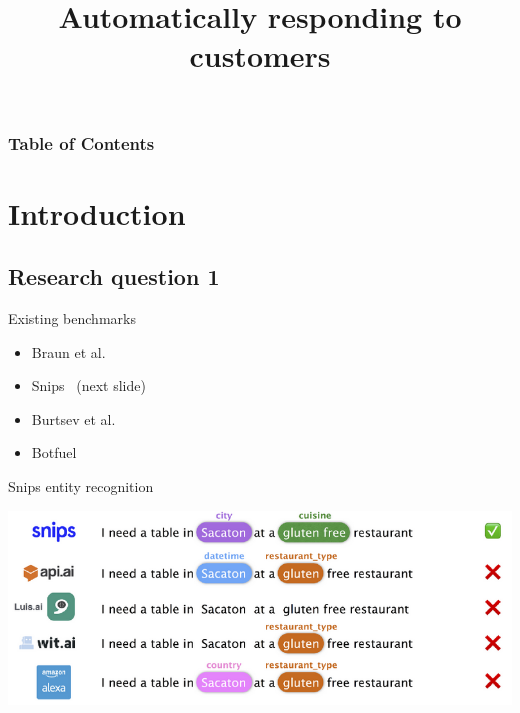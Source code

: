 \documentclass[pdf]{beamer}
\title{Automatically responding to customers}
\begin{document}
    \begin{frame}
        \titlepage
    \end{frame}

    \begin{frame}
        \frametitle{Table of Contents}
        \tableofcontents[hideothersubsections]
    \end{frame}

    \section{Introduction}
    \subsection{Research question 1}
    \begin{frame}{Existing benchmarks}
        \begin{itemize}
            \item Braun et al.~\cite{braun2017}
            \item Snips~\cite{snips2017benchmarking} (next slide)
            \item Burtsev et al.~\cite{burtsev2018}
            \item Botfuel~\cite{botfuel2018benchmark}
        \end{itemize}
    \end{frame}

    \begin{frame}{Snips entity recognition}
        \begin{center}
            \includegraphics[width=\textwidth]{figures/snips_ner.png}
        \end{center}
    \end{frame}
\end{document}
